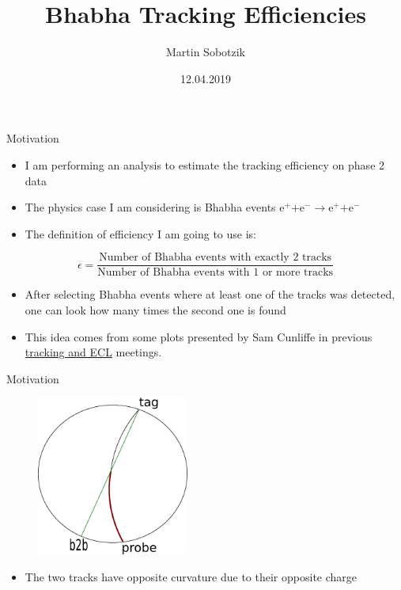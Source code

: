 \documentclass[10pt]{beamer}
\title{Bhabha Tracking Efficiencies}
\date{12.04.2019}
\author{Martin Sobotzik}
\institute{Johannes Gutenberg Universit\"at Mainz}
\begin{document}
\maketitle
{%



\begin{frame}{Motivation}

\begin{itemize}	
	\item I am performing an analysis to estimate the tracking efficiency on phase 2 data
	\item The physics case I am considering is Bhabha events $\textrm{e}^+ \textrm{+e}^- \rightarrow \textrm{e}^+ \textrm{+e}^- $ 
	\item The definition of efficiency I am going to use is:

\end{itemize}
	\begin{equation*}
		\epsilon = \frac{\textrm{Number of Bhabha events with exactly 2 tracks}}{\textrm{Number of Bhabha events with 1 or more tracks}}
	\end{equation*}
	
	\begin{itemize}
		\item After selecting Bhabha events where at least one of the tracks was detected, one can look how many times the second one is found
		\item  This idea comes from some plots presented by Sam Cunliffe in previous  \href{https://confluence.desy.de/display/BI/ECL+Meetings?preview=/84320165/109161400/SCunliffe181123-ECL.pdf}{tracking and ECL} meetings.
	\end{itemize}





\end{frame}
	
	
	\begin{frame}{Motivation}
		\begin{figure}
			\includegraphics[width=5cm]{Plots/b2b}
		\end{figure}
	\begin{itemize}
	\item The two tracks have opposite curvature due to their opposite charge
\end{itemize}



\end{frame}}
\end{document}
